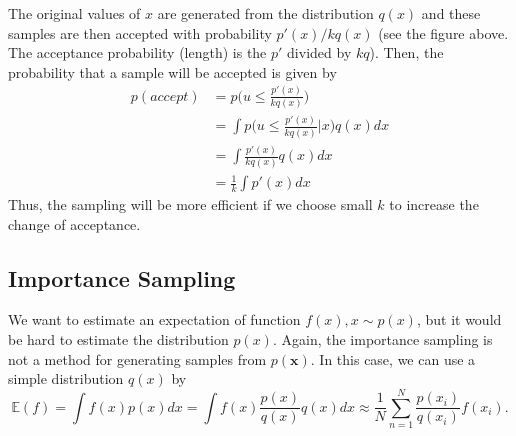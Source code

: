 	The original values of $x$ are generated from the distribution $q(x)$ and these samples are then accepted with probability $p'(x)/kq(x)$ (see the figure above. The acceptance probability (\ie length) is the $p'$ divided by $kq$). Then, the probability that a sample will be accepted is given by   
	\begin{align*}
	p(accept) &= p\Bigg(u\leq \frac{p'(x)}{kq(x)}\Bigg)\\
	&= \int p\Bigg(u\leq \frac{p'(x)}{kq(x)}\bigg|x\Bigg)q(x)dx\\
	& = \int \frac{p'(x)}{kq(x)}q(x)dx\\
	& = \frac{1}{k}\int p'(x)dx
	\end{align*}
	Thus, the sampling will be more efficient if we choose small $k$ to increase the change of acceptance. 

\subsection{Importance Sampling}

We want to estimate an expectation of function $f(x), x\sim p(x)$, but it would be hard to estimate the distribution $p(x)$. Again, the importance sampling is not a method for generating samples from $p(\mathbf{x})$. In this case, we can use a simple distribution $q(x)$ by
$$\mathbb{E}(f) = \int f(x)p(x)dx = \int f(x)\frac{p(x)}{q(x)}q(x)dx \approx \frac{1}{N}\sum_{n=1}^N \frac{p(x_i)}{q(x_i)}f(x_i) .$$

	
